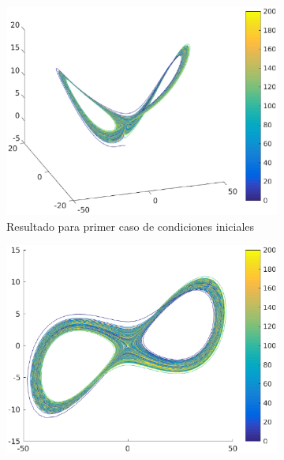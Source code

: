 \documentclass[12pt,letterpaper]{article}
\begin{document}

\begin{figure}
	\centering
	\begin{subfigure}[b]{0.36\textwidth}
		\includegraphics[width=\textwidth]{pictures/tercera_simulacion}
		\caption{Resultado para primer caso de condiciones iniciales}
		\label{fig:simulacion3}
	\end{subfigure}
	\begin{subfigure}[b]{0.36\textwidth}
		\includegraphics[width=\textwidth]{pictures/tercera_simulacion_xy}

\end{subfigure}
\end{figure}
\end{document}
